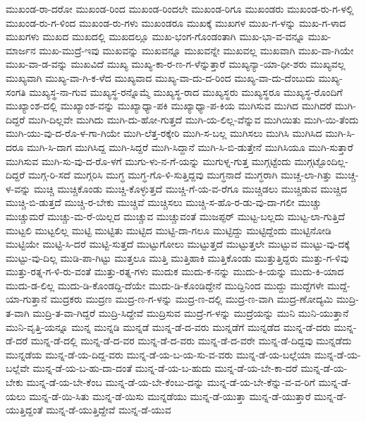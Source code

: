 {ಮುಖಂಡ-ರಾ-ದರೋ
ಮುಖಂಡ-ರಿಂದ
ಮುಖಂಡ-ರಿಂದಲೇ
ಮುಖಂಡ-ರಿಗೂ
ಮುಖಂಡರು
ಮುಖಂಡ-ರು-ಗ-ಳಲ್ಲಿ
ಮುಖಂಡ-ರು-ಗ-ಳಿಂದ
ಮುಖಂಡ-ರು-ಗಳು
ಮುಖಂಡರೂ
ಮುಖಕ್ಕೆ
ಮುಖಗಳ
ಮುಖ-ಗ-ಳನ್ನು
ಮುಖ-ಗ-ಳಾದ
ಮುಖಗಳು
ಮುಖದ
ಮುಖದಲ್ಲಿ
ಮುಖದಲ್ಲೂ
ಮುಖ-ಭಂಗ-ಗೊಂಡಂತಾಗಿ
ಮುಖ-ಭಾ-ವ-ವನ್ನೂ
ಮುಖ-ಮಾರ್ಜನ
ಮುಖ-ಮುದ್ರೆ-ಇವು
ಮುಖವನ್ನು
ಮುಖವನ್ನೂ
ಮುಖವನ್ನೇ
ಮುಖವಲ್ಲ
ಮುಖವಾಗಿ
ಮುಖ-ವಾ-ಗಿಯೇ
ಮುಖ-ವಾ-ಡ-ವನ್ನು
ಮುಖವಿದೆ
ಮುಖ್ಯ
ಮುಖ್ಯ-ಕಾ-ರ-ಣ-ಗ-ಳೆನ್ನುತ್ತಾರೆ
ಮುಖ್ಯನ್ಯಾ-ಯಾ-ಧೀ-ಶರು
ಮುಖ್ಯವಲ್ಲ
ಮುಖ್ಯವಾಗಿ
ಮುಖ್ಯ-ವಾ-ಗಿ-ಕ-ಳೆದ
ಮುಖ್ಯವಾದ
ಮುಖ್ಯ-ವಾ-ದು-ದ-ರಿಂದ
ಮುಖ್ಯ-ವಾ-ದು-ದೆಂಬುದು
ಮುಖ್ಯ-ಸಂಗತಿ
ಮುಖ್ಯಸ್ಥ-ನಾ-ಗುವ
ಮುಖ್ಯಸ್ಥ-ರನ್ನೊಮ್ಮೆ
ಮುಖ್ಯಸ್ಥ-ರಾದ
ಮುಖ್ಯಸ್ಥರು
ಮುಖ್ಯಸ್ಥರೂ
ಮುಖ್ಯಸ್ಥ-ರೊಂದಿಗೆ
ಮುಖ್ಯಾಂಶ-ದಲ್ಲಿ
ಮುಖ್ಯಾಂಶ-ವನ್ನು
ಮುಖ್ಯಾಧ್ಯಾ-ಪಕಿ
ಮುಖ್ಯಾಧ್ಯಾ-ಪ-ಕಿಯ
ಮುಗಿಸುವ
ಮುಗಿದ
ಮುಗಿದರೆ
ಮುಗಿ-ದಿದ್ದರೆ
ಮುಗಿ-ದಿಲ್ಲವೇ
ಮುಗಿದು
ಮುಗಿ-ದು-ಹೋ-ಗುತ್ತದೆ
ಮುಗಿ-ಯ-ಲಿಲ್ಲ-ವೆನ್ನುವ
ಮುಗಿಯಿತು
ಮುಗಿ-ಯಿ-ತೆಂದು
ಮುಗಿ-ಯು-ವು-ದ-ರೊ-ಳ-ಗಾ-ಗಿಯೇ
ಮುಗಿ-ಲೆತ್ತ-ರಕ್ಕೇರಿ
ಮುಗಿ-ಸ-ಬಲ್ಲ
ಮುಗಿಸಲು
ಮುಗಿಸಿ
ಮುಗಿಸಿದ
ಮುಗಿ-ಸಿ-ದರೂ
ಮುಗಿ-ಸಿ-ದಾಗ
ಮುಗಿಸಿದ್ದ
ಮುಗಿ-ಸಿದ್ದರೆ
ಮುಗಿ-ಸಿದ್ದಾನೆ
ಮುಗಿ-ಸಿ-ಬಿ-ಡುತ್ತೇನೆ
ಮುಗಿಸಿಯೂ
ಮುಗಿ-ಸುತ್ತಾರೆ
ಮುಗಿಸುವ
ಮುಗಿ-ಸು-ವು-ದ-ರೊ-ಳಗೆ
ಮುಗು-ಳು-ನ-ಗೆ-ಯನ್ನು
ಮುಗುಳ್ನ-ಗುತ್ತ
ಮುಗ್ಗಟ್ಟೆಂದು
ಮುಗ್ಗಟ್ಟೊಂದಿಲ್ಲ-ದಿದ್ದರೆ
ಮುಗ್ಗ-ರಿ-ಸದೆ
ಮುಗ್ಗರಿಸಿ
ಮುಗ್ಧ
ಮುಗ್ಧ-ಗೊ-ಳಿ-ಸುತ್ತಿದ್ದವು
ಮುಗ್ಧನಾದೆ
ಮುಗ್ಧರಾಗಿ
ಮುಚ್ಚ-ಲಾ-ಗಿತ್ತು
ಮುಚ್ಚ-ಳ-ವನ್ನು
ಮುಚ್ಚಿ
ಮುಚ್ಚಿಕೊಂಡು
ಮುಚ್ಚಿ-ಕೊಳ್ಳುತ್ತದೆ
ಮುಚ್ಚಿ-ಗೆ-ಯ-ವ-ರೆಗೂ
ಮುಚ್ಚಿಡಲು
ಮುಚ್ಚಿಡುವ
ಮುಚ್ಚಿದ
ಮುಚ್ಚಿ-ಬಿ-ಡುತ್ತದೆ
ಮುಚ್ಚಿ-ರ-ಬೇಕು
ಮುಚ್ಚಿವೆ
ಮುಚ್ಚಿಸಲು
ಮುಚ್ಚಿ-ಸ-ಹೊ-ರ-ಡು-ವು-ದಾ-ಗಲೀ
ಮುಚ್ಚು
ಮುಚ್ಚುಮರೆ
ಮುಚ್ಚು-ಮ-ರೆ-ಯಿಲ್ಲದ
ಮುಚ್ಚುವ
ಮುಚ್ಚುವಂತೆ
ಮುಜಪ್ಫರ್
ಮುಟ್ಟ-ಬಲ್ಲದು
ಮುಟ್ಟ-ಲಾ-ಗುತ್ತಿದೆ
ಮುಟ್ಟಲಿ
ಮುಟ್ಟಲಿಲ್ಲ
ಮುಟ್ಟಿ
ಮುಟ್ಟಿತು
ಮುಟ್ಟಿದ
ಮುಟ್ಟಿ-ದಾ-ಗಲೂ
ಮುಟ್ಟಿದ್ದು
ಮುಟ್ಟಿದ್ದೆಂದು
ಮುಟ್ಟಿನೋಡಿ
ಮುಟ್ಟಿಯೇ
ಮುಟ್ಟಿ-ಸಿ-ದರೆ
ಮುಟ್ಟಿ-ಸುತ್ತದೆ
ಮುಟ್ಟುಗೋಲು
ಮುಟ್ಟುತ್ತದೆ
ಮುಟ್ಟುತ್ತಲೇ
ಮುಟ್ಟುವ
ಮುಟ್ಟು-ವು-ದಕ್ಕೆ
ಮುಟ್ಟು-ವು-ದಿಲ್ಲ
ಮುಡಿ-ಪಾ-ಗಿಟ್ಟು
ಮುತ್ತಲೂ
ಮುತ್ತಿ
ಮುತ್ತಿಹಾಕಿ
ಮುತ್ತಿಕೊಂಡು
ಮುತ್ತುತ್ತಿದ್ದರು
ಮುತ್ತು-ಗ-ಳಿವು
ಮುತ್ತು-ರತ್ನ-ಗ-ಳಿ-ರು-ವಂತೆ
ಮುತ್ತು-ರತ್ನ-ಗಳು
ಮುದುಕ
ಮುದು-ಕ-ನನ್ನು
ಮುದು-ಕಿ-ಯನ್ನು
ಮುದು-ಕಿ-ಯಾದ
ಮುದು-ಡ-ಲಿಲ್ಲ
ಮುದು-ಡಿ-ಕೊಂಡದ್ದಿ-ದೆಯೇ
ಮುದು-ಡಿ-ಕೊಂಡಿದ್ದೇನೆ
ಮುದ್ದಿನಿಂದ
ಮುದ್ದು
ಮುದ್ದೆಗಳೇ
ಮುದ್ದೆ-ಯಾ-ಗುತ್ತಾನೆ
ಮುದ್ರಕರು
ಮುದ್ರಣ
ಮುದ್ರ-ಣ-ಗ-ಳನ್ನು
ಮುದ್ರ-ಣ-ದಲ್ಲಿ
ಮುದ್ರ-ಣ-ವಾಗಿ
ಮುದ್ರ-ಣೋದ್ಯಮಿ
ಮುದ್ರಿ-ತ-ವಾಗಿ
ಮುದ್ರಿ-ತ-ವಾ-ಗಿದ್ದರೆ
ಮುದ್ರಿ-ಸಿದ್ದೇವೆ
ಮುದ್ರಿಸುವ
ಮುದ್ರೆ-ಗ-ಳನ್ನು
ಮುದ್ರೆಯನ್ನು
ಮುನಿ
ಮುನಿ-ಯುತ್ತಾನೆ
ಮುನಿ-ವೃತ್ತಿ-ಯನ್ನೂ
ಮುನ್ನ
ಮುನ್ನಡಿ
ಮುನ್ನಡೆ
ಮುನ್ನ-ಡೆ-ದ-ವರು
ಮುನ್ನಡೆಗೆ
ಮುನ್ನಡೆದ
ಮುನ್ನ-ಡೆ-ದರು
ಮುನ್ನ-ಡೆ-ದರೆ
ಮುನ್ನ-ಡೆ-ದಲ್ಲಿ
ಮುನ್ನ-ಡೆ-ದ-ವರ
ಮುನ್ನ-ಡೆ-ದ-ವರು
ಮುನ್ನ-ಡೆ-ದ-ವರೇ
ಮುನ್ನ-ಡೆ-ದಿದ್ದವು
ಮುನ್ನಡೆದು
ಮುನ್ನಡೆಯ
ಮುನ್ನ-ಡೆ-ಯ-ದಿದ್ದ-ವರು
ಮುನ್ನ-ಡೆ-ಯ-ಬ-ಯ-ಸು-ವ-ವರು
ಮುನ್ನ-ಡೆ-ಯ-ಬಲ್ಲೆಯಾ
ಮುನ್ನ-ಡೆ-ಯ-ಬಲ್ಲೆವೇ
ಮುನ್ನ-ಡೆ-ಯ-ಬ-ಹು-ದಾ-ದಂತೆ
ಮುನ್ನ-ಡೆ-ಯ-ಬ-ಹುದು
ಮುನ್ನ-ಡೆ-ಯ-ಬೇ-ಕಾ-ದರೆ
ಮುನ್ನ-ಡೆ-ಯ-ಬೇಕು
ಮುನ್ನ-ಡೆ-ಯ-ಬೇ-ಕೆಂಬ
ಮುನ್ನ-ಡೆ-ಯ-ಬೇ-ಕೆಂಬು-ದನ್ನು
ಮುನ್ನ-ಡೆ-ಯ-ಬೇ-ಕೆನ್ನು-ವ-ವ-ರಿಗೆ
ಮುನ್ನ-ಡೆ-ಯಲು
ಮುನ್ನ-ಡೆ-ಯಿ-ಸಿತು
ಮುನ್ನ-ಡೆ-ಯಿಸು
ಮುನ್ನಡೆಯು
ಮುನ್ನ-ಡೆ-ಯುತ್ತಾ
ಮುನ್ನ-ಡೆ-ಯುತ್ತಾರೆ
ಮುನ್ನ-ಡೆ-ಯುತ್ತಿದ್ದಂತೆ
ಮುನ್ನ-ಡೆ-ಯುತ್ತಿದ್ದೇವೆ
ಮುನ್ನ-ಡೆ-ಯುವ
}
